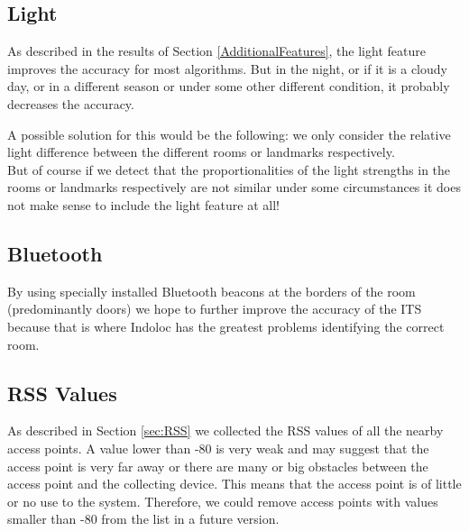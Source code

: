 \subsection{Light}
\label{light}
As described in the results of Section \ref{AdditionalFeatures}, the light feature improves the accuracy for most algorithms. But in the night, or if it is a cloudy day, or in a different season or under some other different condition, it probably decreases the accuracy. 

A possible solution for this would be the following: we only consider the relative light difference between the different rooms or landmarks respectively. \\
But of course if we detect that the proportionalities of the light strengths in the rooms or landmarks respectively are not similar under some circumstances it does not make sense to include the light feature at all!


\subsection{Bluetooth}
By using specially installed Bluetooth beacons at the borders of the room (predominantly doors) we hope to further improve the accuracy of the ITS because that is where Indoloc has the greatest problems identifying the correct room. 

\subsection{RSS Values}
As described in Section \ref{sec:RSS} we collected the RSS values of all the nearby access points. A value lower than -80 is very weak and may suggest that the access point is very far away or there are many or big obstacles between the access point and the collecting device. This means that the access point is of little or no use to the system. Therefore, we could remove access points with values smaller than -80 from the list in a future version.



